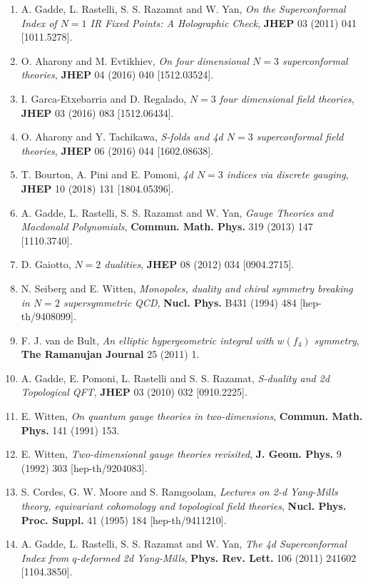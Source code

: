 \begin{enumerate}
\item[{[25]}] A. Gadde, L. Rastelli, S. S. Razamat and W. Yan, \textit{On the Superconformal Index of $N=1$ IR Fixed Points: A Holographic Check}, \textbf{JHEP} 03 (2011) 041 [1011.5278].
\item[{[26]}] O. Aharony and M. Evtikhiev, \textit{On four dimensional $N = 3$ superconformal theories}, \textbf{JHEP} 04 (2016) 040 [1512.03524].
\item[{[27]}] I. Garca-Etxebarria and D. Regalado, \textit{$N = 3$ four dimensional field theories}, \textbf{JHEP} 03 (2016) 083 [1512.06434].
\item[{[28]}] O. Aharony and Y. Tachikawa, \textit{S-folds and 4d $N=3$ superconformal field theories}, \textbf{JHEP} 06 (2016) 044 [1602.08638].
\item[{[29]}] T. Bourton, A. Pini and E. Pomoni, \textit{4d $N = 3$ indices via discrete gauging}, \textbf{JHEP} 10 (2018) 131 [1804.05396].
\item[{[30]}] A. Gadde, L. Rastelli, S. S. Razamat and W. Yan, \textit{Gauge Theories and Macdonald Polynomials}, \textbf{Commun. Math. Phys.} 319 (2013) 147 [1110.3740].
\item[{[31]}] D. Gaiotto, \textit{$N=2$ dualities}, \textbf{JHEP} 08 (2012) 034 [0904.2715].
\item[{[32]}] N. Seiberg and E. Witten, \textit{Monopoles, duality and chiral symmetry breaking in $N=2$ supersymmetric QCD}, \textbf{Nucl. Phys.} B431 (1994) 484 [hep-th/9408099].
\item[{[33]}] F. J. van de Bult, \textit{An elliptic hypergeometric integral with $w(f_4)$ symmetry}, \textbf{The Ramanujan Journal} 25 (2011) 1.
\item[{[34]}] A. Gadde, E. Pomoni, L. Rastelli and S. S. Razamat, \textit{S-duality and 2d Topological QFT}, \textbf{JHEP} 03 (2010) 032 [0910.2225].
\item[{[35]}] E. Witten, \textit{On quantum gauge theories in two-dimensions}, \textbf{Commun. Math. Phys.} 141 (1991) 153.
\item[{[36]}] E. Witten, \textit{Two-dimensional gauge theories revisited}, \textbf{J. Geom. Phys.} 9 (1992) 303 [hep-th/9204083].
\item[{[37]}] S. Cordes, G. W. Moore and S. Ramgoolam, \textit{Lectures on 2-d Yang-Mills theory, equivariant cohomology and topological field theories}, \textbf{Nucl. Phys. Proc. Suppl.} 41 (1995) 184 [hep-th/9411210].
\item[{[38]}] A. Gadde, L. Rastelli, S. S. Razamat and W. Yan, \textit{The 4d Superconformal Index from $q$-deformed 2d Yang-Mills}, \textbf{Phys. Rev. Lett.} 106 (2011) 241602 [1104.3850].

\end{enumerate}
